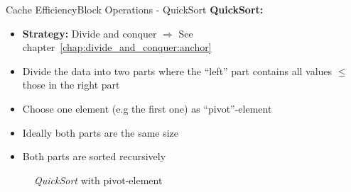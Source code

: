 \begin{frame}{Cache Efficiency}{Block Operations - QuickSort}
  \textbf{QuickSort:}\\
  \begin{itemize}
    \item<2->
      \textbf{Strategy:} Divide and conquer
      $\Rightarrow$ See chapter~\ref{chap:divide_and_conquer:anchor}
      \item<3->
        Divide the data into two parts where the \enquote{left} part contains
        all values {\color{Mittel-Blau}$\leq$} those in the right part
        \item<4->
        Choose one element (e.g the first one) as
        {\color{Mittel-Blau}\enquote{pivot}-element}
      \item<5->
        Ideally both parts are the same size
      \item<6->
        Both parts are sorted recursively
  \end{itemize}
  \vspace{-1em}
  \begin{figure}%
    \begin{adjustbox}{width=\linewidth}%
    \end{adjustbox}%
    \caption{\textit{QuickSort} with pivot-element}
    \label{fig:caching:quicksort_pivot}
  \end{figure}%
\end{frame}



